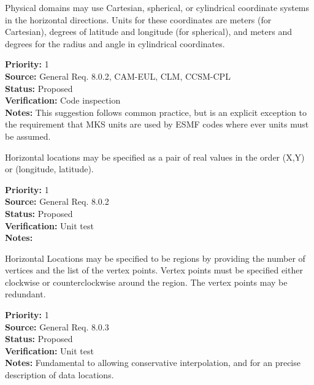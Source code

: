 

Physical domains may use Cartesian, spherical, or cylindrical coordinate
systems in the horizontal directions.  Units for these coordinates are meters
(for Cartesian), degrees of latitude and longitude (for spherical), and meters
and degrees for the radius and angle in cylindrical coordinates.

\begin{reqlist}
{\bf Priority:} 1 \\
{\bf Source:} General Req. 8.0.2, CAM-EUL, CLM, CCSM-CPL \\
{\bf Status:} Proposed \\
{\bf Verification:} Code inspection\\
{\bf Notes:}  This suggestion follows common practice, but is an explicit
exception to the requirement that MKS units are used by ESMF codes where ever
units must be assumed.
\end{reqlist}


   Horizontal locations may be specified as a pair of real values in the order
(X,Y) or (longitude, latitude).
\begin{reqlist}
{\bf Priority:} 1 \\
{\bf Source:} General Req. 8.0.2 \\
{\bf Status:} Proposed \\
{\bf Verification:} Unit test\\
{\bf Notes:} 
\end{reqlist}



  Horizontal Locations may be specified to be regions by providing the number
of vertices and the list of the vertex points.  Vertex points must be specified
either clockwise or counterclockwise around the region.  The vertex points
may be redundant.
\begin{reqlist}
{\bf Priority:} 1 \\
{\bf Source:} General Req. 8.0.3 \\
{\bf Status:} Proposed \\
{\bf Verification:} Unit test\\
{\bf Notes:} Fundamental to allowing conservative interpolation, and for an
precise description of data locations.
\end{reqlist}
 
